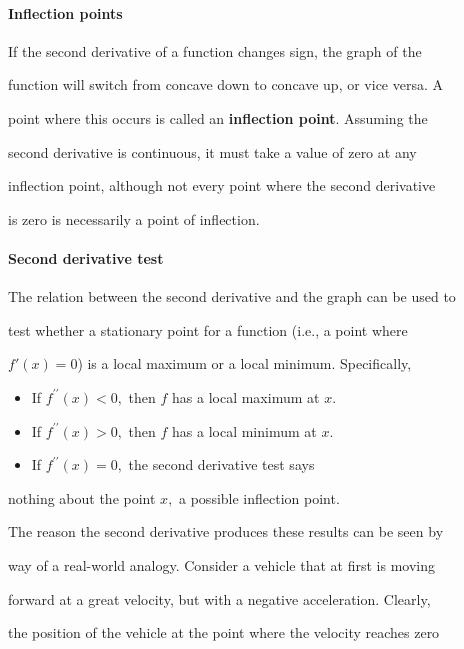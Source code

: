 \paragraph{Inflection points}



If the second derivative of a function changes sign, the graph of the

function will switch from concave down to concave up, or vice versa. A

point where this occurs is called an \textbf{inflection point}. Assuming the

second derivative is continuous, it must take a value of zero at any

inflection point, although not every point where the second derivative

is zero is necessarily a point of inflection.



\paragraph{Second derivative test}



The relation between the second derivative and the graph can be used to

test whether a stationary point for a function (i.e., a point where

$f'(x)=0$) is a local maximum or a local minimum. Specifically,



\begin{itemize}
    \item If $f^{\prime\prime}(x) < 0,$ then $f$ has a local maximum at $x.$
    \item If $f^{\prime\prime}(x) > 0,$ then $f$ has a local minimum at $x.$
    \item If $f^{\prime\prime}(x) = 0,$ the second derivative test says
\end{itemize}
    nothing about the point $x,$ a possible inflection point.



The reason the second derivative produces these results can be seen by

way of a real-world analogy. Consider a vehicle that at first is moving

forward at a great velocity, but with a negative acceleration. Clearly,

the position of the vehicle at the point where the velocity reaches zero

